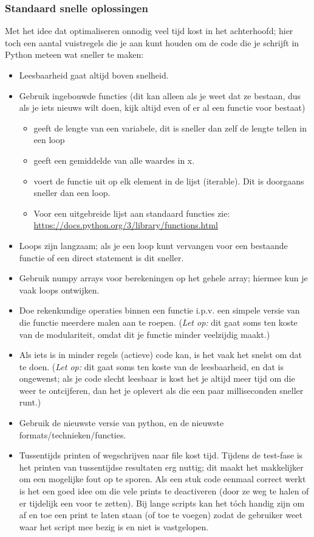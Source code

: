 \documentclass[a4paper,11pt, fleqn]{article}
\begin{document}
\subsubsection{Standaard snelle oplossingen}
Met het idee dat optimaliseren onnodig veel tijd kost in het achterhoofd; hier toch een aantal vuistregels die je aan kunt houden om de code die je schrijft in Python meteen wat sneller te maken:
\begin{itemize}
\item Leesbaarheid gaat altijd boven snelheid.
\item Gebruik ingebouwde functies (dit kan alleen als je weet dat ze bestaan, dus als je iets nieuws wilt doen, kijk altijd even of er al een functie voor bestaat)
\begin{itemize}
\item {} geeft de lengte van een variabele, dit is sneller dan zelf de lengte tellen in een loop
\item {} geeft een gemiddelde van alle waardes in x.
\item {} voert de functie uit op elk element in de lijst (iterable). Dit is doorgaans sneller dan een loop.
\item Voor een uitgebreide lijst aan standaard functies zie: \url{https://docs.python.org/3/library/functions.html}
\end{itemize}
\item Loops zijn langzaam; als je een loop kunt vervangen voor een bestaande functie of een direct statement is dit sneller.
\item Gebruik numpy arrays voor berekeningen op het gehele array; hiermee kun je vaak loops ontwijken.
\item Doe rekenkundige operaties binnen een functie i.p.v. een simpele versie van die functie meerdere malen aan te roepen. (\textit{Let op:} dit gaat soms ten koste van de modulariteit, omdat dit je functie minder veelzijdig maakt.)
\item Als iets is in minder regels (actieve) code kan, is het vaak het snelst om dat te doen. (\textit{Let op:} dit gaat soms ten koste van de leesbaarheid, en dat is ongewenst; als je code slecht leesbaar is kost het je altijd meer tijd om die weer te ontcijferen, dan het je oplevert als die een paar milliseconden sneller runt.)
\item Gebruik de nieuwste versie van python, en de nieuwste formats/technieken/functies.
\item Tussentijds printen of wegschrijven naar file kost tijd. Tijdens de test-fase is het printen van tussentijdse resultaten erg nuttig; dit maakt het makkelijker om een mogelijke fout op te sporen. Als een stuk code eenmaal correct werkt is het een goed idee om die vele prints te deactiveren (door ze weg te halen of er tijdelijk een \pythoninline{#} voor te zetten). Bij lange scripts kan het t\'och handig zijn om af en toe een print te laten staan (of toe te voegen) zodat de gebruiker weet waar het script mee bezig is en niet is vastgelopen.
\end{itemize}
\end{document}
